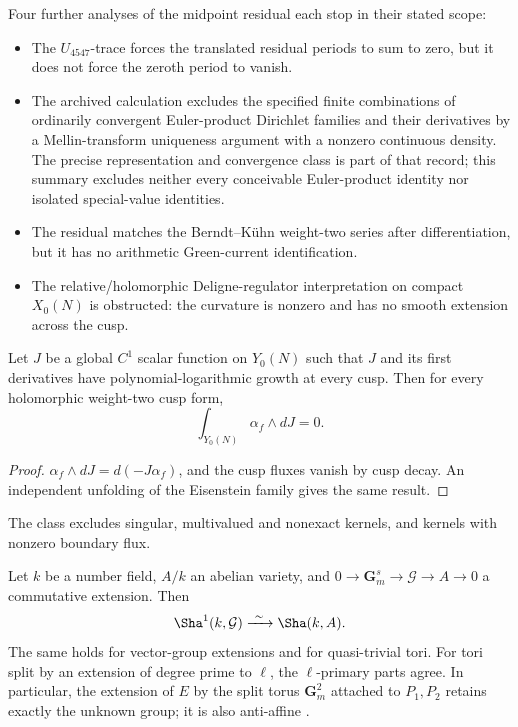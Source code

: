 \begin{researchrecord}\label{obs:midpoint}
Four further analyses of the midpoint residual each stop in their stated scope:
\begin{itemize}[leftmargin=*]
\item The $U_{4547}$-trace forces the translated residual periods to sum to zero, but it does not force the zeroth period to vanish.
\item The archived calculation excludes the specified finite combinations of ordinarily convergent Euler-product Dirichlet families and their derivatives by a Mellin-transform uniqueness argument with a nonzero continuous density. The precise representation and convergence class is part of that record; this summary excludes neither every conceivable Euler-product identity nor isolated special-value identities.
\item The residual matches the Berndt--K\"uhn weight-two series after differentiation, but it has no arithmetic Green-current identification.
\item The relative/holomorphic Deligne-regulator interpretation on compact $X_0(N)$ is obstructed: the curvature is nonzero and has no smooth extension across the cusp.
\end{itemize}
\end{researchrecord}

\begin{obstruction}\label{obs:curv}
Let $J$ be a global $C^1$ scalar function on $Y_0(N)$ such that $J$ and its first derivatives have polynomial-logarithmic growth at every cusp. Then for every holomorphic weight-two cusp form,
\[
\int_{Y_0(N)}\alpha_f\wedge dJ=0 .
\]
\end{obstruction}
\begin{proof}
$\alpha_f\wedge dJ=d(-J\alpha_f)$, and the cusp fluxes vanish by cusp decay. An independent unfolding of the Eisenstein family gives the same result.
\end{proof}
The class excludes singular, multivalued and nonexact kernels, and kernels with nonzero boundary flux.

\begin{obstruction}\label{obs:torus}
Let $k$ be a number field, $A/k$ an abelian variety, and $0\to\mathbf G_m^s\to\mathcal G\to A\to0$ a commutative extension. Then
\[
\Sha^1(k,\mathcal G)\xrightarrow{\ \sim\ }\Sha(k,A).
\]
The same holds for vector-group extensions and for quasi-trivial tori. For tori split by an extension of degree prime to $\ell$, the $\ell$-primary parts agree. In particular, the extension of $E$ by the split torus $\mathbf G_m^2$ attached to $P_1,P_2$ retains exactly the unknown group; it is also anti-affine \cite{brion}.
\end{obstruction}

